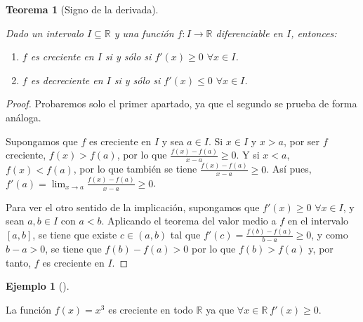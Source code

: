 \documentclass[
  a4paper,
]{scrreport}
\providecommand{\tightlist}{%
  \setlength{\itemsep}{0pt}\setlength{\parskip}{0pt}}\usepackage{longtable,booktabs,array}
\theoremstyle{definition}
\newtheorem{example}{Ejemplo}[chapter]
\theoremstyle{plain}
\theoremstyle{definition}
\theoremstyle{definition}
\theoremstyle{plain}
\newtheorem{theorem}{Teorema}[chapter]
\theoremstyle{plain}
\theoremstyle{remark}
\begin{document}
\begin{theorem}[Signo de la
derivada]\protect\hypertarget{thm-crecimiento-signo-derivada}{}\label{thm-crecimiento-signo-derivada}

Dado un intervalo \(I\subseteq\mathbb{R}\) y una función
\(f:I\to\mathbb{R}\) diferenciable en \(I\), entonces:

\begin{enumerate}
\def\labelenumi{\alph{enumi}.}
\tightlist
\item
  \(f\) es creciente en \(I\) si y sólo si \(f'(x)\geq 0\)
  \(\forall x\in I\).
\item
  \(f\) es decreciente en \(I\) si y sólo si \(f'(x)\leq 0\)
  \(\forall x\in I\).
\end{enumerate}

\end{theorem}

\begin{tcolorbox}[enhanced jigsaw, leftrule=.75mm, colbacktitle=quarto-callout-note-color!10!white, toprule=.15mm, opacityback=0, opacitybacktitle=0.6, toptitle=1mm, breakable, bottomtitle=1mm, colframe=quarto-callout-note-color-frame, rightrule=.15mm, titlerule=0mm, title=\textcolor{quarto-callout-note-color}{\faInfo}\hspace{0.5em}{Demostración}, arc=.35mm, left=2mm, bottomrule=.15mm, colback=white, coltitle=black]

\begin{proof}
Probaremos solo el primer apartado, ya que el segundo se prueba de forma
análoga.

Supongamos que \(f\) es creciente en \(I\) y sea \(a\in I\). Si
\(x\in I\) y \(x>a\), por ser \(f\) creciente, \(f(x)>f(a)\), por lo que
\(\frac{f(x)-f(a)}{x-a}\geq 0\). Y si \(x<a\), \(f(x)<f(a)\), por lo que
también se tiene \(\frac{f(x)-f(a)}{x-a}\geq 0\). Así pues,
\(f'(a)=\lim_{x\to a}\frac{f(x)-f(a)}{x-a}\geq 0\).

Para ver el otro sentido de la implicación, supongamos que
\(f'(x)\geq 0\) \(\forall x\in I\), y sean \(a,b\in I\) con \(a<b\).
Aplicando el teorema del valor medio a \(f\) en el intervalo \([a,b]\),
se tiene que existe \(c\in(a,b)\) tal que
\(f'(c)= \frac{f(b)-f(a)}{b-a}\geq 0\), y como \(b-a>0\), se tiene que
\(f(b)-f(a)>0\) por lo que \(f(b)>f(a)\) y, por tanto, \(f\) es
creciente en \(I\).
\end{proof}

\end{tcolorbox}

\begin{example}[]\protect\hypertarget{exm-crecimiento}{}\label{exm-crecimiento}

La función \(f(x)=x^3\) es creciente en todo \(\mathbb{R}\) ya que
\(\forall x\in \mathbb{R}\ f'(x)\geq 0\).

\end{example}
\end{document}
